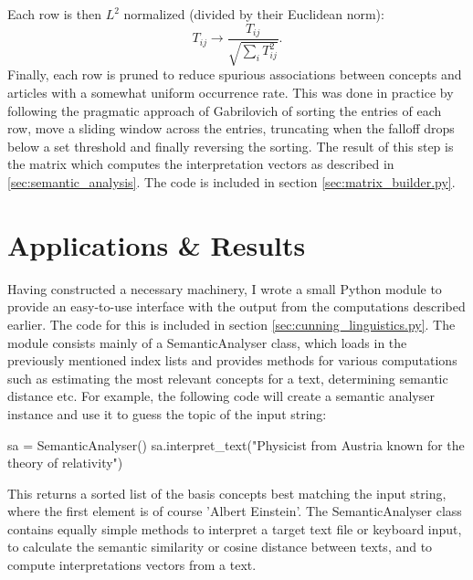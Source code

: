Each row is then $L^2$ normalized (divided by their Euclidean norm):
\begin{equation}
	T_{ij} \rightarrow \frac{T_{ij}}{\sqrt{\sum_i T_{ij}^2}}.
\end{equation}
Finally, each row is pruned to reduce spurious associations between concepts and articles with a somewhat uniform occurrence rate. This was done in practice by following the pragmatic approach of Gabrilovich \cite{ESA} of sorting the entries of each row, move a sliding window across the entries, truncating when the falloff drops below a set threshold and finally reversing the sorting.
The result of this step is the matrix which computes the interpretation vectors as described in \ref{sec:semantic_analysis}. The code is included in section \ref{sec:matrix_builder.py}.


\section{Applications \& Results}
\label{sec:esa_results}
Having constructed a necessary machinery, I wrote a small Python module to provide an easy-to-use interface with the output from the computations described earlier. The code for this is included in section \ref{sec:cunning_linguistics.py}. The module consists mainly of a SemanticAnalyser class, which loads in the previously mentioned index lists and provides methods for various computations such as estimating the most relevant concepts for a text, determining semantic distance etc. For example, the following code will create a semantic analyser instance and use it to guess the topic of the input string:
\begin{snippet}[language=python]
	sa = SemanticAnalyser()
	sa.interpret_text("Physicist from Austria known for the theory of relativity")
\end{snippet}
This returns a sorted list of the basis concepts best matching the input string, where the first element is of course 'Albert Einstein'. The SemanticAnalyser class contains equally simple methods to interpret a target text file or keyboard input, to calculate the semantic similarity or cosine distance between texts, and to compute interpretations vectors from a text.

